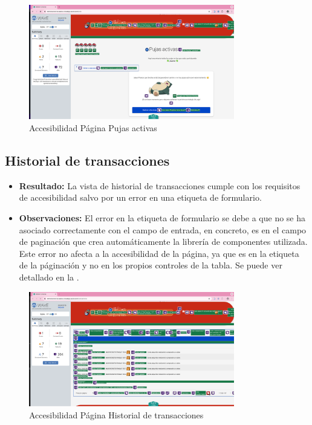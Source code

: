 \begin{figure}[H]
    \centering
    \includegraphics[width=0.8\textwidth]{figures/accesibilidad/A-acc-pujas.png}
    \caption{Accesibilidad Página Pujas activas}
    \label{fig:Acc-Pujas}

\end{figure}


\subsection*{Historial de transacciones}
\begin{itemize}
    \item \textbf{Resultado:} La vista de historial de transacciones cumple con los requisitos de accesibilidad salvo 
    por un error en una etiqueta de formulario.
    \item \textbf{Observaciones:} El error en la etiqueta de formulario se debe a que no se ha asociado correctamente con el campo de entrada,
    en concreto, es en el campo de paginación que crea automáticamente la librería de componentes utilizada.
    Este error no afecta a la accesibilidad de la página, ya que es en la etiqueta de la páginación y no en los propios controles de la tabla.
    Se puede ver detallado en la 
    .
\end{itemize}

\begin{figure}[H]
    \centering
    \includegraphics[width=0.8\textwidth]{figures/accesibilidad/A-acc-transacciones.png}
    \caption{Accesibilidad Página Historial de transacciones}
    \label{fig:Acc-Transacciones}
\end{figure}

